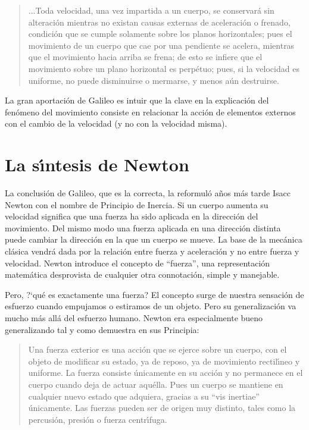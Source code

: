 \begin{quote}...Toda velocidad, una vez impartida a un cuerpo, se conservar\'a sin alteraci\'on mientras no existan causas externas de aceleraci\'on o frenado, condici\'on que se cumple solamente sobre los planos horizontales; pues el movimiento de un cuerpo que cae por una pendiente se acelera, mientras que el movimiento hacia arriba se frena; de esto se infiere que el movimiento sobre un plano horizontal es perp\'etuo; pues, si la velocidad es uniforme, no puede disminuirse o mermarse, y menos a\'un destruirse.\cite{GalileoTwoNewSciences}
\end{quote}

La gran aportaci\'on de Galileo es intuir que la clave en la explicaci\'on del fen\'omeno del movimiento consiste en relacionar la acci\'on de elementos externos con el cambio de la velocidad (y no con la velocidad misma).

\section{La s\'\i{}ntesis de Newton}

La conclusi\'on de Galileo, que es la correcta, la reformul\'o a\~{n}os m\'as tarde Isacc Newton con el nombre de Principio de Inercia.  Si un cuerpo aumenta su velocidad significa que una fuerza ha sido aplicada en la direcci\'on del movimiento. Del mismo modo una fuerza aplicada en una direcci\'on distinta puede cambiar la direcci\'on en la que un cuerpo se mueve. La base de la mec\'anica cl\'asica vendr\'a dada por la relaci\'on entre fuerza y  aceleraci\'on y no entre fuerza y velocidad. Newton introduce el concepto de ``fuerza'', una representaci\'on matem\'atica desprovista de cualquier otra connotaci\'on, simple y manejable.

 Pero, ?`qu\'e es exactamente una fuerza? El concepto surge de nuestra sensaci\'on de esfuerzo cuando empujamos o estiramos de un objeto. Pero su generalizaci\'on va mucho m\'as all\'a del esfuerzo humano. Newton era  especialmente bueno generalizando tal y como demuestra en sus Principia\cite{Newton1687}:
\begin{quote}Una fuerza exterior es una acci\'on que se ejerce sobre un cuerpo, con el objeto de modificar su estado, ya de reposo, ya de movimiento rectil\'\i{}neo y uniforme. La fuerza consiste \'unicamente en su acci\'on y no permanece en el cuerpo cuando deja de actuar aqu\'ella. Pues un cuerpo se mantiene en cualquier nuevo estado que adquiera, gracias a su ``vis inertiae'' \'unicamente. Las fuerzas pueden ser de origen muy distinto, tales como la percusi\'on, presi\'on o fuerza centr\'\i{}fuga.
\end{quote}

